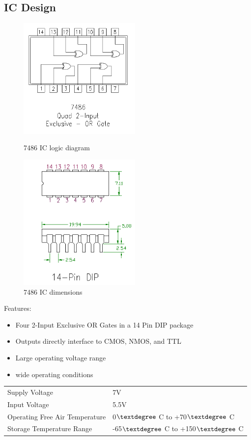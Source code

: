 \documentclass[11pt,a4paper]{article}
\begin{document}
\subsection{IC Design}
\begin{figure}[ht!]
    \centering
    \includegraphics[width=6cm]{pins.png}
    \caption{7486 IC logic diagram}

    \includegraphics[width=6cm]{dimensions.png}
    \caption{7486 IC dimensions}
\end{figure}
Features:
\begin{itemize}
    \item Four 2-Input Exclusive OR Gates in a 14 Pin DIP package
    \item Outputs directly interface to CMOS, NMOS, and TTL
    \item Large operating voltage range
    \item wide operating conditions
\end{itemize}
\begin{tabular}{l l}
    Supply Voltage & 7V\\
    Input Voltage  & 5.5V\\
    Operating Free Air Temperature  & 0$\textdegree$ C to +70$\textdegree$ C\\
    Storage Temperature Range       & -65$\textdegree$ C to +150$\textdegree$ C\\
\end{tabular}
\end{document}
